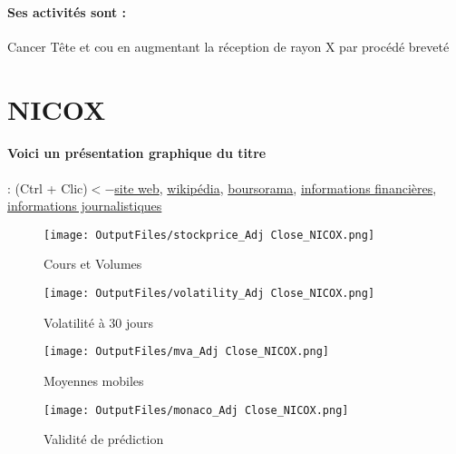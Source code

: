 \documentclass[11pt,a4paper]{report}%
\begin{document}
\paragraph{Ses activités sont : } Cancer Tête et cou en augmentant la réception de rayon X par procédé breveté 
    
    \newpage

\section{NICOX}

\paragraph{Voici un présentation graphique du titre} : (Ctrl + Clic)$<-$\href{http://www.nicox.com/fr/a-propos-de-nicox/}{site web}, \href{https://fr.wikipedia.org/wiki/Nicox}{wikipédia}, \href{https://www.boursorama.com/cours/1rPCOX}{boursorama}, \href{https://www.qwant.com/?q=site:https:%2f%2fwww.easybourse.com%2faction-societe%2fNICOX&t=web&client=ext-firefox-hp}{informations financières}, \href{https://bourse.lerevenu.com/cours-de-bourse/fiche-valeur-synthese/NICOX/COX-FR}{informations journalistiques}
\begin{figure}[!htb]
   \begin{minipage}{0.5\textwidth}
     \centering
     \texttt{[image: OutputFiles/stockprice\_Adj Close\_NICOX.png]}
     \caption{Cours et Volumes}\label{Fig:price_NICOX}
   \end{minipage}\hfill
   \begin{minipage}{0.5\textwidth}
     \centering
     \texttt{[image: OutputFiles/volatility\_Adj Close\_NICOX.png]}
     \caption{Volatilité à 30 jours}\label{Fig:volat_NICOX}
   \end{minipage}
\end{figure}
\begin{figure}[!htb]
   \begin{minipage}{0.5\textwidth}
     \centering
     \texttt{[image: OutputFiles/mva\_Adj Close\_NICOX.png]}
     \caption{Moyennes mobiles}\label{Fig:mva_NICOX}
   \end{minipage}\hfill
   \begin{minipage}{0.5\textwidth}
     \centering
     \texttt{[image: OutputFiles/monaco\_Adj Close\_NICOX.png]}
     \caption{Validité de prédiction}\label{Fig:prediction_NICOX}
   \end{minipage}
\end{figure}
\end{document}
